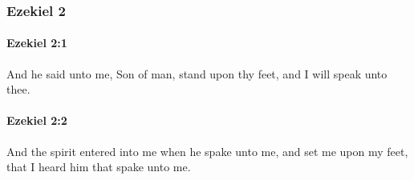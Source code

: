 	\subsubsection{Ezekiel 2} %
		\label{EZEKIEL-2}

		\paragraph{Ezekiel 2:1} %
			\label{EZEKIEL-2-1}

			And he said unto me, Son of man, stand upon thy feet, and I will speak unto thee.


		\paragraph{Ezekiel 2:2} %
			\label{EZEKIEL-2-2}

			And the spirit entered into me when he spake unto me, and set me upon my feet, that I heard him that spake unto me.

